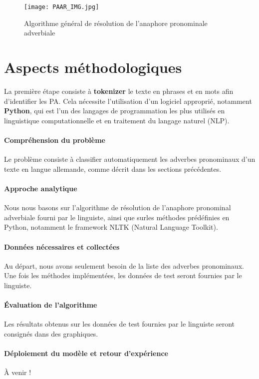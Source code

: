 \documentclass[]{article}
\begin{document}
	\begin{figure}
		\centering
		\texttt{[image: PAAR\_IMG.jpg]}
		\caption{Algorithme général de résolution de l'anaphore pronominale adverbiale}
		\label{fig:image}
	\end{figure}
	
	\section{Aspects méthodologiques}
	La première étape consiste à \textbf{tokenizer} le texte en phrases et en mots afin d'identifier les PA. Cela nécessite l'utilisation d'un logiciel approprié, notamment \textbf{Python}, qui est l'un des langages de programmation les plus utilisés en linguistique computationnelle et en traitement du langage naturel (NLP).
	
	\paragraph{Compréhension du problème}
	Le problème consiste à classifier automatiquement les adverbes pronominaux d'un texte en langue allemande, comme décrit dans les sections précédentes.
	
	\paragraph{Approche analytique}
	Nous nous basons sur l'algorithme de résolution de l'anaphore pronominal adverbiale fourni par le linguiste, ainsi que surles méthodes prédéfinies en Python, notamment le framework NLTK (Natural Language Toolkit).
	
	\paragraph{Données nécessaires et collectées}
	Au départ, nous avons seulement besoin de la liste des adverbes pronominaux. Une fois les méthodes implémentées, les données de test seront fournies par le linguiste.
	
	\paragraph{Évaluation de l'algorithme}
	Les résultats obtenus sur les données de test fournies par le linguiste seront consignés dans des graphiques.
	
	\paragraph{Déploiement du modèle et retour d'expérience}
	À venir !
	
\end{document}

